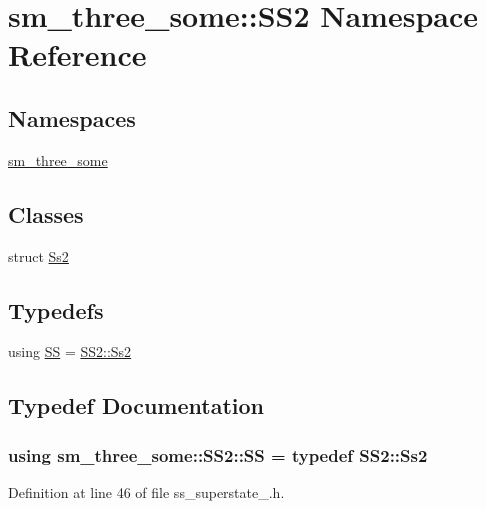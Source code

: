 \hypertarget{namespacesm__three__some_1_1SS2}{}\section{sm\+\_\+three\+\_\+some\+:\+:S\+S2 Namespace Reference}
\label{namespacesm__three__some_1_1SS2}
\subsection*{Namespaces}
\begin{DoxyCompactItemize}
\item 
 \hyperlink{namespacesm__three__some_1_1SS2_1_1sm__three__some}{sm\+\_\+three\+\_\+some}
\end{DoxyCompactItemize}
\subsection*{Classes}
\begin{DoxyCompactItemize}
\item 
struct \hyperlink{structsm__three__some_1_1SS2_1_1Ss2}{Ss2}
\end{DoxyCompactItemize}
\subsection*{Typedefs}
\begin{DoxyCompactItemize}
\item 
using \hyperlink{namespacesm__three__some_1_1SS2_adb18b566c3db9acef75fc2f0e9236b60}{SS} = \hyperlink{structsm__three__some_1_1SS2_1_1Ss2}{S\+S2\+::\+Ss2}
\end{DoxyCompactItemize}


\subsection{Typedef Documentation}
\subsubsection[{\texorpdfstring{SS}{SS}}]{\setlength{\rightskip}{0pt plus 5cm}using {\bf sm\+\_\+three\+\_\+some\+::\+S\+S2\+::\+SS} = typedef {\bf S\+S2\+::\+Ss2}}\hypertarget{namespacesm__three__some_1_1SS2_adb18b566c3db9acef75fc2f0e9236b60}{}\label{namespacesm__three__some_1_1SS2_adb18b566c3db9acef75fc2f0e9236b60}


Definition at line 46 of file ss\+\_\+superstate\+\_.\+h.

